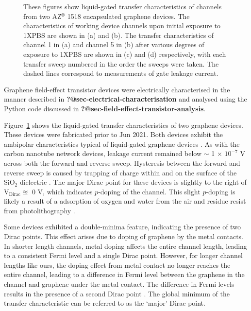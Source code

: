 \documentclass[
  a4paper,
]{scrbook}
\begin{document}
\begin{figure}
\begin{minipage}[t]{0.47\linewidth}
{{}

}

\subcaption{\label{fig-graphene-transfer-comparison-2}}
\end{minipage}%

\caption{\label{fig-pristine-graphene}These figures show liquid-gated
transfer characteristics of channels from two AZ\(^\circledR\) 1518
encapsulated graphene devices. The characteristics of working device
channels upon initial exposure to 1XPBS are shown in (a) and (b). The
transfer characteristics of channel 1 in (a) and channel 5 in (b) after
various degrees of exposure to 1XPBS are shown in (c) and (d)
respectively, with each transfer sweep numbered in the order the sweeps
were taken. The dashed lines correspond to measurements of gate leakage
current.}

\end{figure}

Graphene field-effect transistor devices were electrically characterised
in the manner described in \textbf{?@sec-electrical-characterisation}
and analysed using the Python code discussed in
\textbf{?@sec-field-effect-transistor-analysis}.

Figure~\ref{fig-pristine-graphene} shows the liquid-gated transfer
characteristics of two graphene devices. These devices were fabricated
prior to Jun 2021. Both devices exhibit the ambipolar characteristics
typical of liquid-gated graphene devices
\autocite{Heller2009a,Heller2010,Xia2010,Kireev2017}. As with the carbon
nanotube network devices, leakage current remained below \(\sim\) 1
\(\times\) \(10^{-7}\) V across both the forward and reverse sweep.
Hysteresis between the forward and reverse sweep is caused by trapping
of charge within and on the surface of the SiO\(_{2}\) dielectric
\autocite{Bartolomeo2011}. The major Dirac point for these devices is
slightly to the right of V\(_{\textrm{Dirac}} \approxeq\) 0 V, which
indicates \(p\)-doping of the channel. This slight \(p\)-doping is
likely a result of a adsorption of oxygen and water from the air and
residue resist from photolithography
\autocite{Cheng2011,Shin2012,Kireev2017}.

Some devices exhibited a double-minima feature, indicating the presence
of two Dirac points. This effect arises due to doping of graphene by the
metal contacts. In shorter length channels, metal doping affects the
entire channel length, leading to a consistent Fermi level and a single
Dirac point. However, for longer channel lengths like ours, the doping
effect from metal contact no longer reaches the entire channel, leading
to a difference in Fermi level between the graphene in the channel and
graphene under the metal contact. The difference in Fermi levels results
in the presence of a second Dirac point
\autocite{Bartolomeo2011,Feng2014,Peng2018}. The global minimum of the
transfer characteristic can be referred to as the `major' Dirac point.
\end{document}
